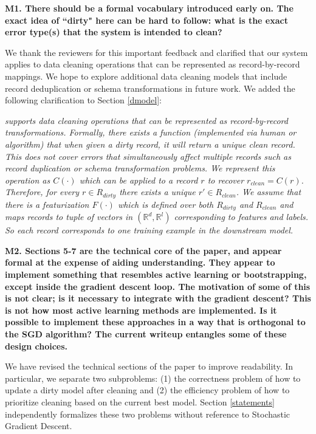 \noindent\noindent \textbf{M1. There should be a formal vocabulary introduced early on. The exact idea of ``dirty" here can be hard to follow: what is the exact error type(s) that the system is intended to clean?}

\vspace{0.5em}

We thank the reviewers for this important feedback and clarified that our system applies to data cleaning operations that can be represented as record-by-record mappings.
We hope to explore additional data cleaning models that include record deduplication or schema transformations in future work.
We added the following clarification to Section \ref{dmodel}:

\emph{\sys supports data cleaning operations that can be represented as record-by-record transformations.
Formally, there exists a function (implemented via human or algorithm) that when given a dirty record, it will return a unique clean record.
This does not cover errors that simultaneously affect multiple records such as record duplication or schema transformation problems.
We represent this operation as $C(\cdot)$ which can be applied to a record $r$ to recover $r_{clean} = C(r)$.
Therefore, for every $r \in R_{dirty}$ there exists a unique $r' \in R_{clean}$.
We assume that there is a featurization $F(\cdot)$ which is defined over both $R_{dirty}$ and $R_{clean}$ and maps records to tuple of vectors in $(\mathbb{R}^d, \mathbb{R}^l)$ corresponding to features and labels.
So each record corresponds to one training example in the downstream model.}

\vspace{0.5em}

\noindent\textbf{M2. Sections 5-7 are the technical core of the paper, and appear formal at the expense of aiding understanding. They appear to implement something that resembles active learning or bootstrapping, except inside the gradient descent loop. The motivation of some of this is not clear; is it necessary to integrate with the gradient descent? This is not how most active learning methods are implemented. Is it possible to implement these approaches in a way that is orthogonal to the SGD algorithm? The current writeup entangles some of these design choices.} 

We have revised the technical sections of the paper to improve readability.
In particular, we separate two subproblems: (1) the correctness problem of how to update a dirty model after cleaning and (2) the efficiency problem of how to prioritize cleaning based on the current best model.
Section \ref{statements} independently formalizes these two problems without reference to Stochastic Gradient Descent.

